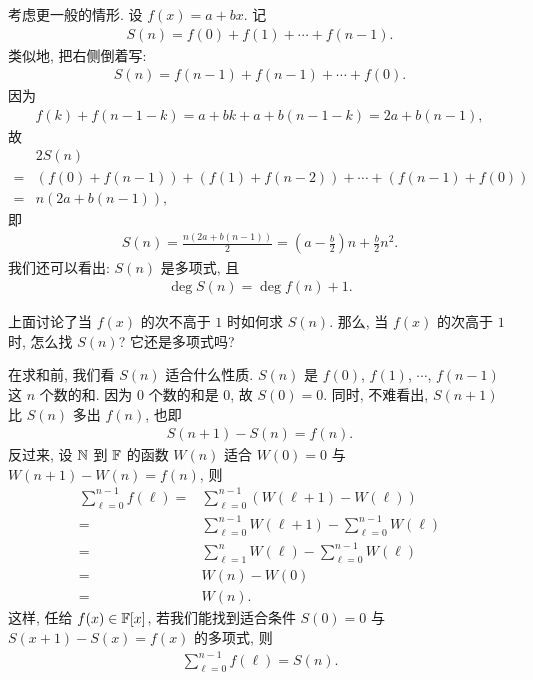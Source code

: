 \begin{example}
    考虑更一般的情形. 设 $f(x) = a + bx$. 记
    \begin{align*}
        S(n) = f(0) + f(1) + \cdots + f(n-1).
    \end{align*}
    类似地, 把右侧倒着写:
    \begin{align*}
        S(n) = f(n-1) + f(n-1) + \cdots + f(0).
    \end{align*}
    因为
    \begin{align*}
        f(k) + f(n-1-k) = a + bk + a + b(n-1-k) = 2a + b(n - 1),
    \end{align*}
    故
    \begin{align*}
             & 2S(n)                                                        \\
        = {} & (f(0) + f(n-1)) + (f(1) + f(n-2)) + \cdots + (f(n-1) + f(0)) \\
        = {} & n(2a + b(n - 1)),
    \end{align*}
    即
    \begin{align*}
        S(n) = \frac{n(2a + b(n - 1))}{2} = \left(a - \frac{b}{2}\right) n + \frac{b}{2} n^2.
    \end{align*}
    我们还可以看出: $S(n)$ 是多项式, 且
    \begin{align*}
        \deg S(n) = \deg f(n) + 1.
    \end{align*}
\end{example}

上面讨论了当 $f(x)$ 的次不高于 $1$ 时如何求 $S(n)$. 那么, 当 $f(x)$ 的次高于 $1$ 时, 怎么找 $S(n)$? 它还是多项式吗?

在求和前, 我们看 $S(n)$ 适合什么性质. $S(n)$ 是 $f(0)$, $f(1)$, $\cdots$, $f(n-1)$ 这 $n$ 个数的和. 因为 $0$ 个数的和是 $0$, 故 $S(0) = 0$. 同时, 不难看出, $S(n+1)$ 比 $S(n)$ 多出 $f(n)$, 也即
\begin{align*}
    S(n+1) - S(n) = f(n).
\end{align*}
反过来, 设 $\mathbb{N}$ 到 $\mathbb{F}$ 的函数 $W(n)$ 适合 $W(0) = 0$ 与 $W(n+1) - W(n) = f(n)$, 则
\begin{align*}
    \sum_{\ell = 0}^{n - 1} f(\ell)
    = {} & \sum_{\ell = 0}^{n - 1} (W(\ell+1) - W(\ell))                       \\
    = {} & \sum_{\ell = 0}^{n - 1} W(\ell+1) - \sum_{\ell = 0}^{n - 1} W(\ell) \\
    = {} & \sum_{\ell = 1}^{n} W(\ell) - \sum_{\ell = 0}^{n - 1} W(\ell)       \\
    = {} & W(n) - W(0)                                                         \\
    = {} & W(n).
\end{align*}
这样, 任给 $f(x) \in \mathbb{F}[x]$, 若我们能找到适合条件 $S(0) = 0$ 与 $S(x+1) - S(x) = f(x)$ 的多项式, 则
\begin{align*}
    \sum_{\ell = 0}^{n - 1} f(\ell) = S(n).
\end{align*}

